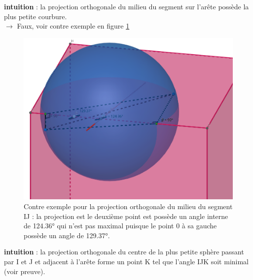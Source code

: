 \documentclass{article}
\begin{document}
\textbf{intuition} : la projection orthogonale du milieu du segment sur l'arête possède la plus petite courbure.\\
$\rightarrow$ Faux, voir contre exemple en figure \ref{fig:contre_ex_2}

\begin{figure}[!h]
    \centering
    \includegraphics[width=0.5\linewidth]{contre_ex_2.png}
    \caption{Contre exemple pour la projection orthogonale du milieu du segment IJ : la projection est le deuxième point est possède un angle interne de 124.36° qui n'est pas maximal puisque le point 0 à sa gauche possède un angle de 129.37°.}
    \label{fig:contre_ex_2}
\end{figure}

\textbf{intuition} : la projection orthogonale du centre de la plus petite sphère passant par I et J et adjacent à l'arête forme un point K tel que l'angle IJK soit minimal (voir preuve).
\end{document}
